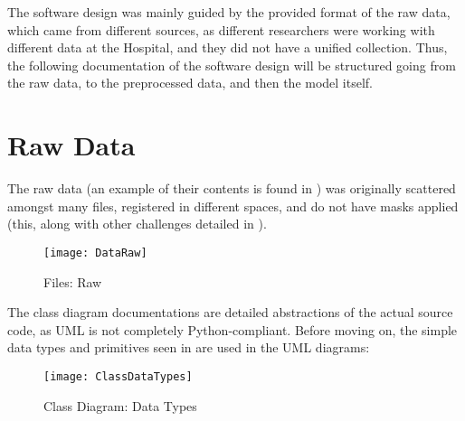 The software design was mainly guided by the provided format of the raw data, which came from different sources, as different researchers were working with different data at the Hospital, and they did not have a unified collection. Thus, the following documentation of the software design will be structured going from the raw data, to the preprocessed data, and then the model itself.

\section{Raw Data}

The raw data (an example of their contents is found in ) was originally scattered amongst many files, registered in different spaces, and do not have masks applied (this, along with other challenges detailed in ).

\begin{figure}[H]
\centering
\texttt{[image: DataRaw]}
\caption{Files: Raw}
\label{fig:digfilraw}
\end{figure}

The class diagram documentations are detailed abstractions of the actual source code, as \ac{UML} is not completely Python-compliant. Before moving on, the simple data types and primitives seen in  are used in the \ac{UML} diagrams:

\begin{figure}[H]
\centering
\texttt{[image: ClassDataTypes]}
\caption{Class Diagram: Data Types}
\label{fig:digclstyp}
\end{figure}

